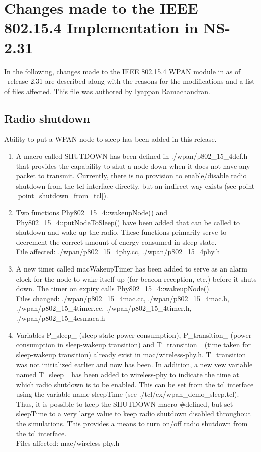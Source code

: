 \chapter{Changes made to the IEEE 802.15.4 Implementation in NS-2.31}
\label{chap:wpan}

In the following, changes made to the IEEE 802.15.4 WPAN module in as
of \ns\ release 2.31
are described along with the reasons for the modifications and a list
of files affected.  This file was authored by Iyappan Ramachandran.

\section{Radio shutdown}
Ability to put a WPAN node to sleep has been added in this release. 
\\
\begin{enumerate}

\item{A macro called SHUTDOWN has been defined in ./wpan/p802\_15\_4def.h
that provides the capability to shut a node down when it does not
have any packet to transmit. Currently, there is no provision to enable/disable radio shutdown from the tcl interface directly, but an indirect way exists (see point \ref{point_shutdown_from_tcl}). }

\item{Two functions \mbox{Phy802\_15\_4::wakeupNode()} and
\mbox{Phy802\_15\_4::putNodeToSleep()} have been added that can be
called to shutdown and wake up the radio. These functions primarily
serve to decrement the correct amount of energy consumed in sleep
state. \\
File affected: ./wpan/p802\_15\_4phy.cc,  ./wpan/p802\_15\_4phy.h}

\item{A new timer called macWakeupTimer has been added to serve as an alarm clock
for the node to wake itself up (for beacon reception, etc.) before it shuts down. The timer on expiry calls
\mbox{Phy802\_15\_4::wakeupNode()}.\\
Files changed: ./wpan/p802\_15\_4mac.cc, ./wpan/p802\_15\_4mac.h,
./wpan/p802\_15\_4timer.cc, ./wpan/p802\_15\_4timer.h,
./wpan/p802\_15\_4csmaca.h}

\item{\label{point_shutdown_from_tcl}Variables P\_sleep\_ (sleep state power consumption), P\_transition\_ (power consumption in sleep-wakeup transition) and T\_transition\_ (time taken for sleep-wakeup transition)
already exist in mac/wireless-phy.h. T\_transition\_ was not initialized earlier and now has been.
In addition, a new vew variable named T\_sleep\_ has been added to wireless-phy to indicate the time at which radio shutdown is to be enabled. This can be set from the tcl interface using the variable name sleepTime (see \mbox{./tcl/ex/wpan\_demo\_sleep.tcl}). Thus, it is possible to keep the SHUTDOWN macro \#defined, but set sleepTime to a  very large value to keep radio shutdown disabled throughout the simulations. This provides a means to turn on/off radio shutdown from the tcl interface.\\
Files affected: mac/wireless-phy.h}


\end{enumerate}

